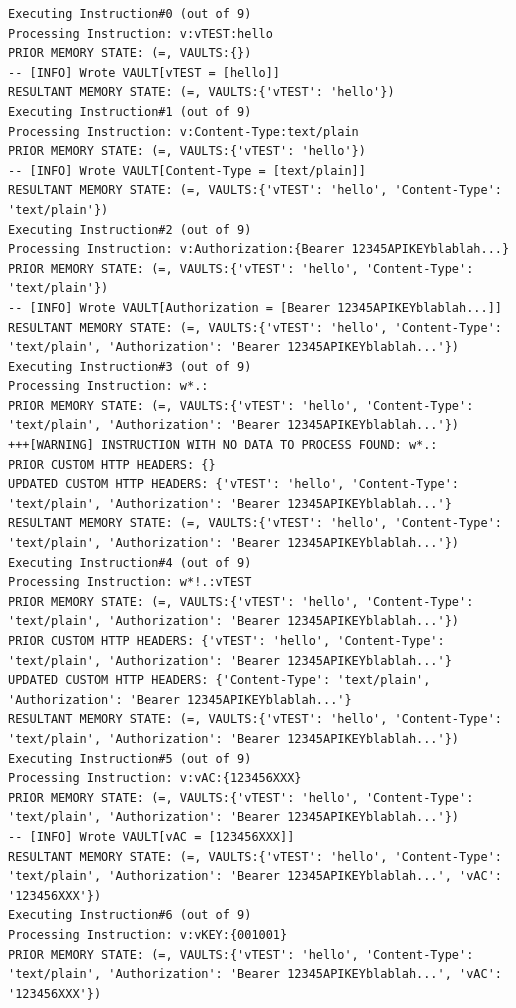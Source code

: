 \documentclass[a4paper, 18pt]{book} %
\begin{document}
{{{\begin{tcolorbox}[myterminalstyle, title=DEBUGGING a TEA custom HTTP HEADERS with HTTP POST scenario, breakable]
\begin{lstlisting}[breaklines=true]
Executing Instruction#0 (out of 9)
Processing Instruction: v:vTEST:hello
PRIOR MEMORY STATE: (=, VAULTS:{})
-- [INFO] Wrote VAULT[vTEST = [hello]]
RESULTANT MEMORY STATE: (=, VAULTS:{'vTEST': 'hello'})
Executing Instruction#1 (out of 9)
Processing Instruction: v:Content-Type:text/plain
PRIOR MEMORY STATE: (=, VAULTS:{'vTEST': 'hello'})
-- [INFO] Wrote VAULT[Content-Type = [text/plain]]
RESULTANT MEMORY STATE: (=, VAULTS:{'vTEST': 'hello', 'Content-Type': 'text/plain'})
Executing Instruction#2 (out of 9)
Processing Instruction: v:Authorization:{Bearer 12345APIKEYblablah...}
PRIOR MEMORY STATE: (=, VAULTS:{'vTEST': 'hello', 'Content-Type': 'text/plain'})
-- [INFO] Wrote VAULT[Authorization = [Bearer 12345APIKEYblablah...]]
RESULTANT MEMORY STATE: (=, VAULTS:{'vTEST': 'hello', 'Content-Type': 'text/plain', 'Authorization': 'Bearer 12345APIKEYblablah...'})
Executing Instruction#3 (out of 9)
Processing Instruction: w*.: 
PRIOR MEMORY STATE: (=, VAULTS:{'vTEST': 'hello', 'Content-Type': 'text/plain', 'Authorization': 'Bearer 12345APIKEYblablah...'})
+++[WARNING] INSTRUCTION WITH NO DATA TO PROCESS FOUND: w*.: 
PRIOR CUSTOM HTTP HEADERS: {}
UPDATED CUSTOM HTTP HEADERS: {'vTEST': 'hello', 'Content-Type': 'text/plain', 'Authorization': 'Bearer 12345APIKEYblablah...'}
RESULTANT MEMORY STATE: (=, VAULTS:{'vTEST': 'hello', 'Content-Type': 'text/plain', 'Authorization': 'Bearer 12345APIKEYblablah...'})
Executing Instruction#4 (out of 9)
Processing Instruction: w*!.:vTEST 
PRIOR MEMORY STATE: (=, VAULTS:{'vTEST': 'hello', 'Content-Type': 'text/plain', 'Authorization': 'Bearer 12345APIKEYblablah...'})
PRIOR CUSTOM HTTP HEADERS: {'vTEST': 'hello', 'Content-Type': 'text/plain', 'Authorization': 'Bearer 12345APIKEYblablah...'}
UPDATED CUSTOM HTTP HEADERS: {'Content-Type': 'text/plain', 'Authorization': 'Bearer 12345APIKEYblablah...'}
RESULTANT MEMORY STATE: (=, VAULTS:{'vTEST': 'hello', 'Content-Type': 'text/plain', 'Authorization': 'Bearer 12345APIKEYblablah...'})
Executing Instruction#5 (out of 9)
Processing Instruction: v:vAC:{123456XXX} 
PRIOR MEMORY STATE: (=, VAULTS:{'vTEST': 'hello', 'Content-Type': 'text/plain', 'Authorization': 'Bearer 12345APIKEYblablah...'})
-- [INFO] Wrote VAULT[vAC = [123456XXX]]
RESULTANT MEMORY STATE: (=, VAULTS:{'vTEST': 'hello', 'Content-Type': 'text/plain', 'Authorization': 'Bearer 12345APIKEYblablah...', 'vAC': '123456XXX'})
Executing Instruction#6 (out of 9)
Processing Instruction: v:vKEY:{001001}
PRIOR MEMORY STATE: (=, VAULTS:{'vTEST': 'hello', 'Content-Type': 'text/plain', 'Authorization': 'Bearer 12345APIKEYblablah...', 'vAC': '123456XXX'})

\end{lstlisting}
\end{tcolorbox}}}}
\end{document}
